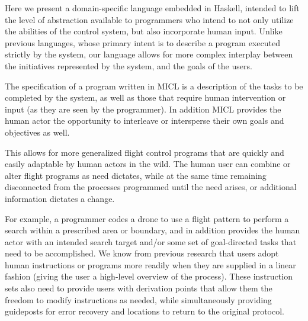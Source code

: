 \documentclass{sig-alternate-05-2015}
\begin{document}
Here we present a domain-specific language embedded in Haskell, intended to
lift the level of abstraction available to programmers who intend to not only
utilize the abilities of the control system, but also incorporate human
input. Unlike previous languages, whose primary intent is to describe a
program executed strictly by the system, our language allows for more complex
interplay between the initiatives represented by the system, and the goals
of the users.

The specification of a program written in MICL is a description of the
tasks to be completed by the system, as well as those that require human
intervention or input (as they are seen by the programmer). In addition
MICL provides the human actor the opportunity to interleave or
intersperse their own goals and objectives as well.



This allows for more generalized flight control programs that are quickly and
easily adaptable by human actors in the wild. The human user can combine or
alter flight programs as need dictates, while at the same time remaining
disconnected from the processes programmed until the need arises, or
additional information dictates a change.

For example, a programmer codes a drone to use a flight pattern to perform
a search within a prescribed area or boundary, and in addition provides the
human actor with an intended search target and/or some set of goal-directed
tasks that need to be accomplished. We know from previous research
\cite{abbott2015prog} that users adopt human instructions or programs more
readily when they are supplied in a linear fashion (giving the user a
high-level overview of the process). These instruction sets also need to
provide users with derivation points that allow them the freedom to modify
instructions as needed, while simultaneously providing guideposts for error
recovery and locations to return to the original protocol.
\end{document}
